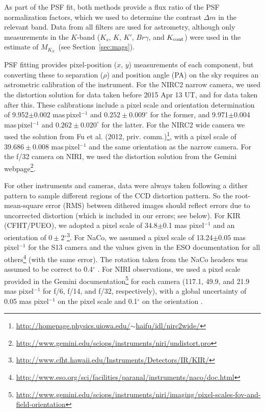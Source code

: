 \documentclass[twocolumn]{aastex62}
\newcommand{\mks}{$M_{K_S}$}
\newcommand{\degree}{$^{\circ}$}
\begin{document}
As part of the PSF fit, both methods provide a flux ratio of the PSF normalization factors, which we used to determine the contrast $\Delta m$ in the relevant band. Data from all filters are used for astrometry, although only measurements in the $K$-band ($K_s$, $K$, $K'$, $Br\gamma$, and $K_{\rm{cont}}$) were used in the estimate of \mks\ (see Section~\ref{sec:mags}).

PSF fitting provides pixel-position ($x$, $y$) measurements of each component, but converting these to separation ($\rho$) and position angle (PA) on the sky requires an astrometric calibration of the instrument. For the NIRC2 narrow camera, we used the \citet{Yelda2010} distortion solution for data taken before 2015 Apr 13 UT, and \citet{2016PASP..128i5004S} for data taken after this. These calibrations include a pixel scale and orientation determination of 9.952$\pm$0.002 mas\,pixel$^{-1}$ and $0.252\pm0.009^{\circ}$ for the former, and 9.971$\pm$0.004 mas\,pixel$^{-1}$ and $0.262\pm0.020^{\circ}$ for the latter. For the NIRC2 wide camera we used the solution from Fu et al. (2012, priv. comm.)\footnote{\href{http://homepage.physics.uiowa.edu/~haifu/idl/nirc2wide/}{http://homepage.physics.uiowa.edu/$\sim$haifu/idl/nirc2wide/}}, with a pixel scale of $39.686\pm0.008$ mas\,pixel$^{-1}$ and the same orientation as the narrow camera. For the f/32 camera on NIRI, we used the distortion solution from the Gemini webpage\footnote{\href{http://www.gemini.edu/sciops/instruments/niri/undistort.pro}{http://www.gemini.edu/sciops/instruments/niri/undistort.pro}}. 

For other instruments and cameras, data were always taken following a dither pattern to sample different regions of the CCD distortion pattern. So the root-mean-square error (RMS) between dithered images should reflect errors due to uncorrected distortion (which is included in our errors; see below). For KIR (CFHT/PUEO), we adopted a pixel scale of 34.8$\pm$0.1 mas pixel$^{-1}$ \citep{2003ApJ...589..410S} and an orientation of $0\pm2$\degree \footnote{\href{http://www.cfht.hawaii.edu/Instruments/Detectors/IR/KIR/}{http://www.cfht.hawaii.edu/Instruments/Detectors/IR/KIR/}}. For NaCo, we assumed a pixel scale of 13.24$\pm0.05$ mas pixel$^{-1}$ for the S13 camera \citep{2003A&A...411..157M,2005A&A...435L..13N} and the values given in the ESO documentation for all others\footnote{\href{http://www.eso.org/sci/facilities/paranal/instruments/naco/doc.html}{http://www.eso.org/sci/facilities/paranal/instruments/naco/doc.html}} (with the same error). The rotation taken from the NaCo headers was assumed to be correct to 0.4$^{\circ}$ \citep{Sef2008}. For NIRI observations, we used a pixel scale provided in the Gemini documentation\footnote{\href{http://www.gemini.edu/sciops/instruments/niri/imaging/pixel-scales-fov-and-field-orientation}{http://www.gemini.edu/sciops/instruments/niri/imaging/pixel-scales-fov-and-field-orientation}} for each camera (117.1, 49.9, and 21.9 mas pixel$^{-1}$ for f/6, f/14, and f/32, respectively), with a global uncertainty of 0.05 mas pixel$^{-1}$ on the pixel scale and 0.1$^{\circ}$ on the orientation \citep{2004ApJ...614..235B}. 
\end{document}
